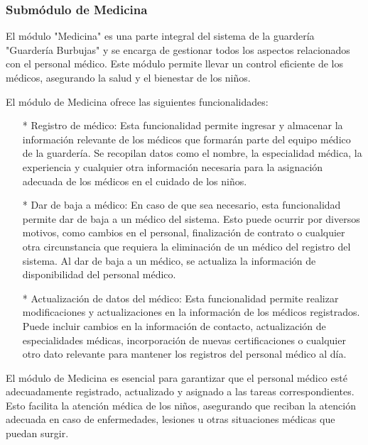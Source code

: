 \subsubsection{Submódulo de Medicina}

El módulo "Medicina" es una parte integral del sistema de la guardería "Guardería Burbujas" y se encarga de gestionar todos los aspectos relacionados con el personal médico. Este módulo permite llevar un control eficiente de los médicos, asegurando la salud y el bienestar de los niños.

El módulo de Medicina ofrece las siguientes funcionalidades:

\begin{itemize}
\item[*] Registro de médico: Esta funcionalidad permite ingresar y almacenar la información relevante de los médicos que formarán parte del equipo médico de la guardería. Se recopilan datos como el nombre, la especialidad médica, la experiencia y cualquier otra información necesaria para la asignación adecuada de los médicos en el cuidado de los niños.
\item[*] Dar de baja a médico: En caso de que sea necesario, esta funcionalidad permite dar de baja a un médico del sistema. Esto puede ocurrir por diversos motivos, como cambios en el personal, finalización de contrato o cualquier otra circunstancia que requiera la eliminación de un médico del registro del sistema. Al dar de baja a un médico, se actualiza la información de disponibilidad del personal médico.
\item[*] Actualización de datos del médico: Esta funcionalidad permite realizar modificaciones y actualizaciones en la información de los médicos registrados. Puede incluir cambios en la información de contacto, actualización de especialidades médicas, incorporación de nuevas certificaciones o cualquier otro dato relevante para mantener los registros del personal médico al día.
\end{itemize}

El módulo de Medicina es esencial para garantizar que el personal médico esté adecuadamente registrado, actualizado y asignado a las tareas correspondientes. Esto facilita la atención médica de los niños, asegurando que reciban la atención adecuada en caso de enfermedades, lesiones u otras situaciones médicas que puedan surgir.


